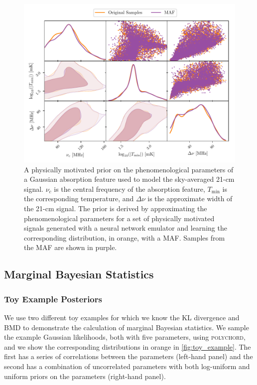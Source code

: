 \begin{figure}
    \centering
    \includegraphics{margarine/figs/physical_prior_example.pdf}
    \caption{A physically motivated prior on the phenomenological parameters of a Gaussian absorption feature used to model the sky-averaged 21-cm signal. $\nu_c$ is the central frequency of the absorption feature, $T_\mathrm{min}$ is the corresponding temperature, and $\Delta \nu$ is the approximate width of the 21-cm signal. The prior is derived by approximating the phenomenological parameters for a set of physically motivated signals generated with a neural network emulator and learning the corresponding distribution, in orange, with a MAF. Samples from the MAF are shown in purple.}
    \label{fig:physical_prior}
\end{figure}

\subsection{Marginal Bayesian Statistics}
\subsubsection{Toy Example Posteriors}

We use two different toy examples for which we know the KL divergence and BMD to demonstrate the calculation of marginal Bayesian statistics. We sample the example Gaussian likelihoods, both with five parameters, using \textsc{polychord}, and we show the corresponding distributions in orange in \cref{fig:toy_example}. The first has a series of correlations between the parameters (left-hand panel) and the second has a combination of uncorrelated parameters with both log-uniform and uniform priors on the parameters (right-hand panel).

